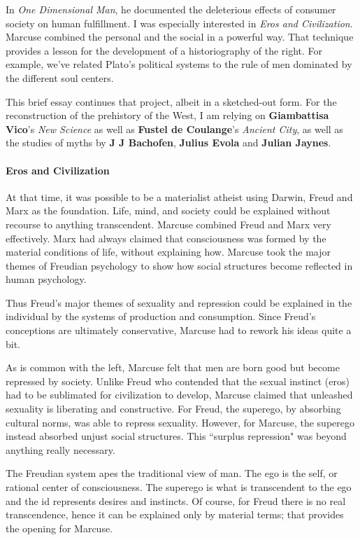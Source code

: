 In \emph{One Dimensional Man}, he documented the deleterious effects of consumer society on human fulfillment. I was especially interested in \emph{Eros and Civilization}. Marcuse combined the personal and the social in a powerful way. That technique provides a lesson for the development of a historiography of the right. For example, we've related Plato's political systems to the rule of men dominated by the different soul centers.

This brief essay continues that project, albeit in a sketched-out form. For the reconstruction of the prehistory of the West, I am relying on \textbf{Giambattisa Vico}'s \emph{New Science} as well as \textbf{Fustel de Coulange}'s \emph{Ancient City}, as well as the studies of myths by \textbf{J J Bachofen}, \textbf{Julius Evola} and \textbf{Julian Jaynes}.

\paragraph{Eros and Civilization}
At that time, it was possible to be a materialist atheist using Darwin, Freud and Marx as the foundation. Life, mind, and society could be explained without recourse to anything transcendent. Marcuse combined Freud and Marx very effectively. Marx had always claimed that consciousness was formed by the material conditions of life, without explaining how. Marcuse took the major themes of Freudian psychology to show how social structures become reflected in human psychology.

Thus Freud's major themes of sexuality and repression could be explained in the individual by the systems of production and consumption. Since Freud's conceptions are ultimately conservative, Marcuse had to rework his ideas quite a bit.

As is common with the left, Marcuse felt that men are born good but become repressed by society. Unlike Freud who contended that the sexual instinct (eros) had to be sublimated for civilization to develop, Marcuse claimed that unleashed sexuality is liberating and constructive. For Freud, the superego, by absorbing cultural norms, was able to repress sexuality. However, for Marcuse, the superego instead absorbed unjust social structures. This ``surplus repression" was beyond anything really necessary.

The Freudian system apes the traditional view of man. The ego is the self, or rational center of consciousness. The superego is what is transcendent to the ego and the id represents desires and instincts. Of course, for Freud there is no real transcendence, hence it can be explained only by material terms; that provides the opening for Marcuse.

